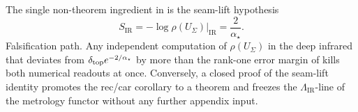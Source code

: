 \begin{remark}
The single non-theorem ingredient in  is the seam-lift
hypothesis
\[
S_{\mathrm{IR}}=-\log\rho(U_\Sigma)\bigl|_{\mathrm{IR}}=\frac{2}{\alpha_\star}.
\]
Falsification path. Any independent computation of $\rho(U_\Sigma)$ in the deep infrared that
deviates from $\delta_{\mathrm{top}} e^{-2/\alpha_\star}$ by more than the rank-one error margin of
 kills both numerical readouts at once. Conversely, a closed
proof of the seam-lift identity promotes the rec/car corollary to a theorem and freezes the
\(\Lambda_{\mathrm{IR}}\)-line of the metrology functor without any further appendix input.
\end{remark}

